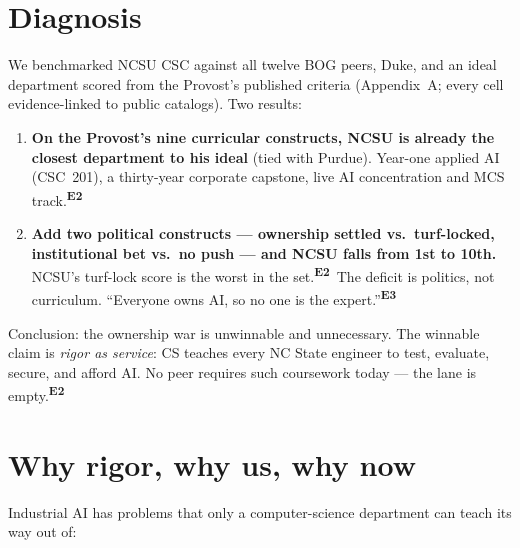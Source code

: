 \documentclass[11pt]{article}
\newcommand{\Epeer}{\textsuperscript{\color{wolf}\sffamily\bfseries E2}}   %
\newcommand{\Epos}{\textsuperscript{\color{inkgray}\sffamily\bfseries E3}} %
\begin{document}
\section{Diagnosis}

We benchmarked NCSU CSC against all twelve BOG peers, Duke, and an ideal department scored from the Provost's published criteria (Appendix~A; every cell evidence-linked to public catalogs). Two results:

\begin{enumerate}[itemsep=2pt]
\item \textbf{On the Provost's nine curricular constructs, NCSU is already the closest department to his ideal} (tied with Purdue). Year-one applied AI (CSC~201), a thirty-year corporate capstone, live AI concentration and MCS track.\Epeer
\item \textbf{Add two political constructs --- ownership settled vs.\ turf-locked, institutional bet vs.\ no push --- and NCSU falls from 1st to 10th.} NCSU's turf-lock score is the worst in the set.\Epeer\ The deficit is politics, not curriculum. ``Everyone owns AI, so no one is the expert.''\Epos
\end{enumerate}

Conclusion: the ownership war is unwinnable and unnecessary. The winnable claim is \emph{rigor as service}: CS teaches every NC State engineer to test, evaluate, secure, and afford AI. No peer requires such coursework today --- the lane is empty.\Epeer

\section{Why rigor, why us, why now}

Industrial AI has problems that only a computer-science department can teach its way out of:
\end{document}
